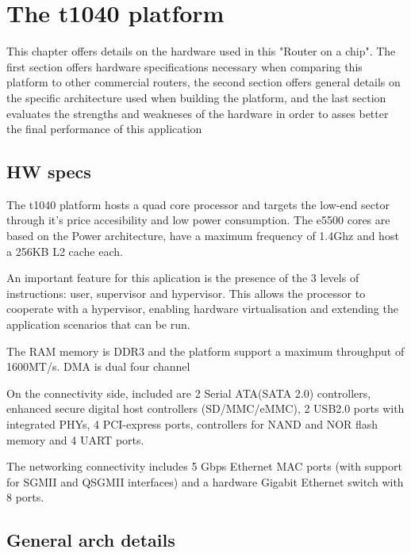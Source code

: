 \chapter{The t1040 platform}
\label{chapter:t1040-platform}

This chapter offers details on the hardware used in this "Router on a chip".
The first section offers hardware specifications necessary when comparing this
platform to other commercial routers, the second section offers general
details on the specific architecture used when building the platform,
and the last section evaluates the strengths and weakneses of the hardware
in order to asses better the final performance of this application


\section{HW specs}
\label{sec:specs}

The t1040 platform hosts a quad core processor and targets the low-end
sector through it's price accesibility and low power consumption.
The e5500 cores are based on the Power architecture, have a maximum
frequency of 1.4Ghz and host a 256KB L2 cache each.

An important feature for this aplication is the presence of the 
3 levels of instructions: user, supervisor and hypervisor. This allows 
the processor to cooperate with a hypervisor, enabling hardware 
virtualisation and extending the application scenarios that can be run.

The RAM memory is DDR3 and the platform support a maximum throughput of
1600MT/s. DMA is dual four channel


On the connectivity side, included are 2 Serial ATA(SATA 2.0) controllers,
enhanced secure digital host controllers (SD/MMC/eMMC), 2 USB2.0 ports
with integrated PHYs, 4 PCI-express ports, controllers for NAND and NOR
flash memory and 4 UART ports.


The networking connectivity includes 5 Gbps Ethernet MAC ports (with support for
SGMII and QSGMII interfaces) and a hardware Gigabit Ethernet switch with 8 ports.

\section{General arch details}
\label{sub-sec:arch-details}

